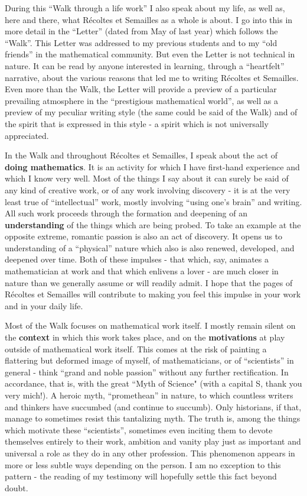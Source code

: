 During this ``Walk through a life work'' 
I also speak about my life,
as well as, here and there, what 
R\'ecoltes et Semailles as a whole
is about.
I go into this in more detail in the ``Letter'' 
(dated from May of last year) which
follows the ``Walk''. 
This Letter was addressed to my
previous students and to my ``old friends'' in the mathematical community. 
But even the Letter is not technical in nature. 
It can be read by anyone
interested in learning,
through a ``heartfelt'' narrative, about the various reasons that led me to writing 
R\'ecoltes et Semailles. Even more than the Walk, the Letter will provide a 
preview of a particular prevailing atmosphere in the ``prestigious mathematical world'',
as well as a preview of my peculiar writing style (the same could be said of the Walk) and of the
spirit that is expressed in this style - a spirit which is not universally
appreciated. 

In the Walk and throughout R\'ecoltes et Semailles, I speak about the act of 
\textbf{doing mathematics}.
It is an activity for which I have first-hand experience and which I know very well. Most of the
things I say about it can surely be said of any kind of creative work, or of any work involving
discovery - it is at the very least true of ``intellectual''
work, mostly involving ``using one's brain'' and writing. 
All such work proceeds through the formation and deepening of an
\textbf{understanding} of the things which are being probed. 
To take an example at the 
opposite extreme, romantic passion is also an act of discovery. 
It opens us to understanding of a ``physical'' nature which also is also renewed, developed, and deepened over time. 
Both of these impulses - 
that which, say, animates a mathematician at work and
that which enlivens a lover 
- are much closer in nature than we generally assume or will readily admit. 
I hope that the pages of 
R\'ecoltes et Semailles 
will contribute to making you feel this impulse in your work and in your daily life. 

Most of the Walk focuses on mathematical work itself. 
I mostly remain silent on the \textbf{context} in which this work takes place, and
on the \textbf{motivations} at play outside of mathematical work itself. 
This comes at the risk of painting a flattering but deformed image of myself, of mathematicians, or of ``scientists'' in general - think ``grand and noble passion'' without any further rectification.
In accordance, that is, with the great ``Myth of Science" 
(with a capital S, thank you very mich!).
A heroic myth, ``promethean'' in nature, to which countless writers and thinkers have succumbed 
(and continue to succumb). 
Only historians, if that, manage to sometimes resist this tantalizing myth. 
The truth is, among the things which motivate these ``scientists'',
sometimes even inciting them to devote themselves entirely to their work, ambition and vanity
play just as important and universal a role as they do in any other profession. 
This phenomenon 
appears in
more or less subtle ways depending on the person. I am no exception to this pattern -
the reading of my testimony will hopefully settle this fact beyond doubt. 

